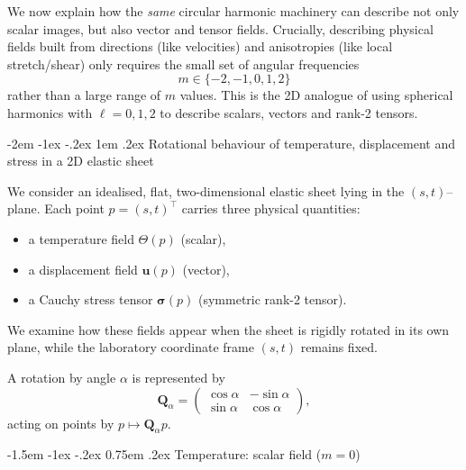\documentclass[12pt]{article}
\makeatletter
\renewcommand\section{\@startsection {section}{1}{\z@}%
                                   {-2em \@plus -1ex \@minus -.2ex}%
                                   {1em \@plus.2ex}%
                                   {\normalfont\Large\bfseries}}
\renewcommand\subsection{\@startsection{subsection}{2}{\z@}%
                                     {-1.5em \@plus -1ex \@minus -.2ex}%
                                     {0.75em \@plus .2ex}%
                                     {\normalfont\large\bfseries}}
\makeatother
\begin{document}
We now explain how the \emph{same} circular harmonic machinery can
describe not only scalar images, but also vector and tensor fields.
Crucially, describing physical fields built from directions (like
velocities) and anisotropies (like local stretch/shear) only requires
the small set of angular frequencies
\[
  m \in \{-2,-1,0,1,2\}
\]
rather than a large range of $m$ values. This is the 2D analogue of
using spherical harmonics with $\ell=0,1,2$ to describe scalars,
vectors and rank-2 tensors.















\section{Rotational behaviour of temperature, displacement and stress
in a 2D elastic sheet}
\label{sec:elastic-sheet-example}

We consider an idealised, flat, two-dimensional elastic sheet lying in
the $(s,t)$–plane. Each point $p = (s,t)^\top$ carries three physical
quantities:
\begin{itemize}
  \item a temperature field $\Theta(p)$ (scalar),
  \item a displacement field $\mathbf{u}(p)$ (vector),
  \item a Cauchy stress tensor $\boldsymbol{\sigma}(p)$
        (symmetric rank-2 tensor).
\end{itemize}
We examine how these fields appear when the sheet is rigidly rotated
in its own plane, while the laboratory coordinate frame $(s,t)$ remains
fixed.

A rotation by angle $\alpha$ is represented by
\begin{equation}
  \label{eq:elastic-rotation-matrix}
  \mathbf{Q}_\alpha
  =
  \begin{pmatrix}
    \cos\alpha & -\sin\alpha\\
    \sin\alpha & \cos\alpha
  \end{pmatrix},
\end{equation}
acting on points by $p \mapsto \mathbf{Q}_\alpha p$.

\subsection{Temperature: scalar field (\texorpdfstring{$m=0$}{m=0})}
\end{document}

